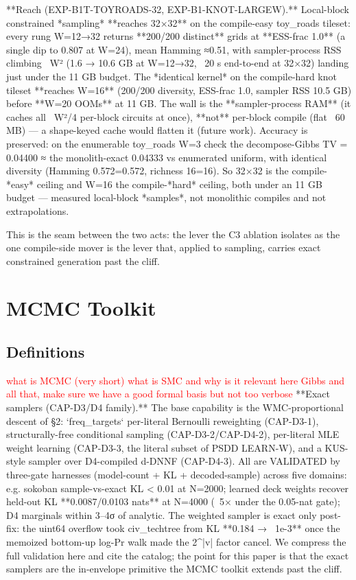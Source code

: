 \documentclass[letterpaper]{article} %
\newcommand{\todo}[1]{\textcolor{red}{#1}}
\begin{document}
**Reach (EXP-B1T-TOYROADS-32, EXP-B1-KNOT-LARGEW).** Local-block constrained *sampling* **reaches
32×32** on the compile-easy toy_roads tileset: every rung W=12→32 returns **200/200 distinct** grids
at **ESS-frac 1.0** (a single dip to 0.807 at W=24), mean Hamming ≈0.51, with sampler-process RSS
climbing ~W² (1.6 → 10.6 GB at W=12→32, ~20 s end-to-end at 32×32) landing just under the 11 GB
budget. The *identical kernel* on the compile-hard knot tileset **reaches W=16** (200/200 diversity,
ESS-frac 1.0, sampler RSS 10.5 GB) before **W=20 OOMs** at 11 GB. The wall is the **sampler-process
RAM** (it caches all ~W²/4 per-block circuits at once), **not** per-block compile (flat ~60 MB) — a
shape-keyed cache would flatten it (future work). Accuracy is preserved: on the enumerable toy_roads
W=3 check the decompose-Gibbs TV = 0.04400 ≈ the monolith-exact 0.04333 vs enumerated uniform, with
identical diversity (Hamming 0.572=0.572, richness 16=16). So 32×32 is the compile-*easy* ceiling and
W=16 the compile-*hard* ceiling, both under an 11 GB budget — measured local-block *samples*, not
monolithic compiles and not extrapolations.

This is the seam between the two acts: the lever the C3 ablation isolates as the one compile-side
mover is the lever that, applied to sampling, carries exact constrained generation past the cliff.

\section{MCMC Toolkit}
\subsection{Definitions}
\todo{what is MCMC (very short) }
\todo{what is SMC and why is it relevant here}
\todo{Gibbs and all that, make sure we have a good formal basis but not too verbose}
**Exact samplers (CAP-D3/D4 family).** The base capability is the WMC-proportional descent of §2:
`freq_targets` per-literal Bernoulli reweighting (CAP-D3-1), structurally-free conditional sampling
(CAP-D3-2/CAP-D4-2), per-literal MLE weight learning (CAP-D3-3, the literal subset of PSDD LEARN-W),
and a KUS-style sampler over D4-compiled d-DNNF (CAP-D4-3). All are VALIDATED by three-gate harnesses
(model-count + KL + decoded-sample) across five domains: e.g. sokoban sample-vs-exact KL < 0.01 at
N=2000; learned deck weights recover held-out KL **0.0087/0.0103 nats** at N=4000 (~5× under the
0.05-nat gate); D4 marginals within 3–4σ of analytic. The weighted sampler is exact only post-fix:
the uint64 overflow took civ_techtree from KL **0.184 → ~1e-3** once the memoized bottom-up
log-Pr walk made the 2^|v| factor cancel. We compress the full validation here and cite the catalog;
the point for this paper is that the exact samplers are the in-envelope primitive the MCMC toolkit
extends past the cliff.
\end{document}

